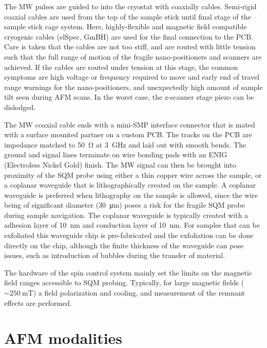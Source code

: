  The \gls{MW} pulses are guided to into the cryostat with coaxially cables. Semi-rigid coaxial cables are used from the top of the sample stick until final stage of the sample stick cage system. Here, highly-flexible and magnetic field compatible cryogenic cables (elSpec, GmBH) are used for the final connection to the \gls{PCB}. Care is taken that the cables are not too stiff, and are routed with little tension such that the full range of motion of the fragile nano-positioners and scanners are achieved. If the cables are routed under tension at this stage, the common symptoms are high voltage or frequency required to move and early end of travel range warnings for the nano-positioners, and unexpectedly high amount of sample tilt seen during \gls{AFM} scans. In the worst case, the z-scanner stage piezo can be dislodged.

 The \gls{MW} coaxial cable ends with a mini-SMP interface connector that is mated with a surface mounted partner on a custom \gls{PCB}. The tracks on the \gls{PCB} are impedance matched to \qty{50}{\ohm} at \qty{3}{\giga\hertz}\cite{CGIWcalc} and laid out with smooth bends. The ground and signal lines terminate on wire bonding pads with an \gls{ENIG} (Electroless Nickel Gold) finish. The \gls{MW} signal can then be brought into proximity of the \gls{SQM} probe using either a thin copper wire across the sample, or a coplanar waveguide that is lithographically created on the sample. A coplanar waveguide is preferred when lithography on the sample is allowed, since the wire being of significant diameter (\qty{30}{\micro\meter}) poses a risk for the fragile \gls{SQM} probe during sample navigation. The coplanar waveguide is typically created with a  adhesion layer of \qty{10}{\nano\meter} and  conduction layer of \qty{10}{\nano\meter}. For samples that can be exfoliated this waveguide chip is pre-fabricated and the exfoliation can be done directly on the chip, although the finite thickness of the waveguide can pose issues, such as introduction of bubbles during the transfer of material. 

 The hardware of the spin control system mainly set the limits on the magnetic field ranges accessible to \gls{SQM} probing. Typically, for large magnetic fields ($\sim\qty{250}{\milli\tesla}$) a field polarization and cooling, and measurement of the remnant effects are performed. 

\section{AFM modalities}

